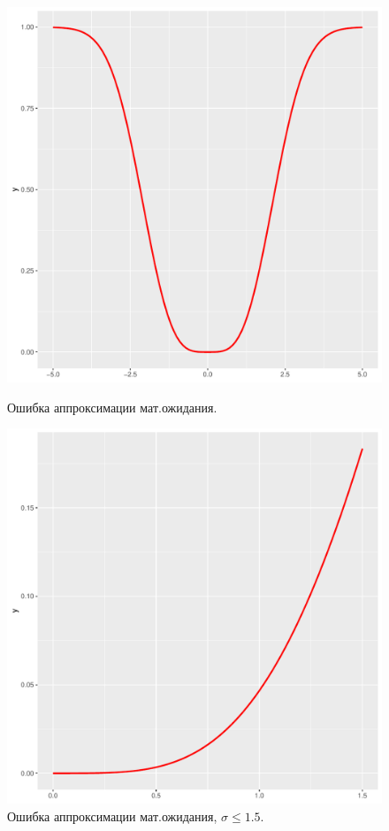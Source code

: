 \documentclass[12pt]{article}
\begin{document}
\begin{figure}[h]
	\begin{center}
		\begin{minipage}[h]{0.4\linewidth}
			\includegraphics[width=1\linewidth]{ris4.pdf}
			\caption{Ошибка аппроксимации мат.ожидания.} %
			\label{ris1} %
		\end{minipage}
		\hfill
		\begin{minipage}[h]{0.4\linewidth}
			\includegraphics[width=1\linewidth]{ris1.pdf}
			\caption{Ошибка аппроксимации мат.ожидания, $\sigma\leq 1.5.$}
			\label{ris2}
		\end{minipage}
	\end{center}
\end{figure}
\end{document}

